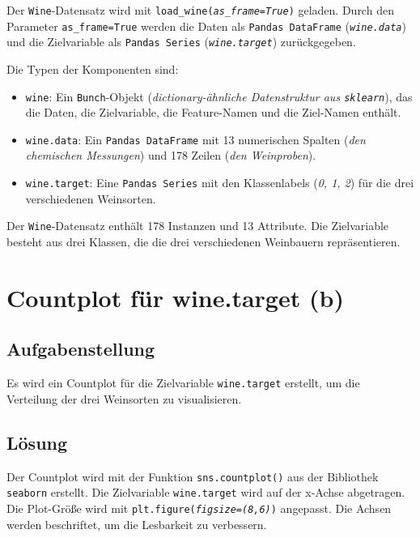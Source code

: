 Der \texttt{Wine}-Datensatz wird mit \texttt{load\_wine(\textit{as\_frame=True})} geladen. Durch den Parameter \texttt{as\_frame=True} werden die Daten als \texttt{Pandas DataFrame} (\textit{\texttt{wine.data}}) und die Zielvariable als \texttt{Pandas Series} (\textit{\texttt{wine.target}}) zurückgegeben.

Die Typen der Komponenten sind:

\begin{itemize}
    \item \texttt{wine}: Ein \texttt{Bunch}-Objekt (\textit{dictionary-ähnliche Datenstruktur aus \texttt{sklearn}}), das die Daten, die Zielvariable, die Feature-Namen und die Ziel-Namen enthält.
    \item \texttt{wine.data}: Ein \texttt{Pandas DataFrame} mit 13 numerischen Spalten (\textit{den chemischen Messungen}) und 178 Zeilen (\textit{den Weinproben}).
    \item \texttt{wine.target}: Eine \texttt{Pandas Series} mit den Klassenlabels (\textit{0, 1, 2}) für die drei verschiedenen Weinsorten.
\end{itemize}

Der \texttt{Wine}-Datensatz enthält 178 Instanzen und 13 Attribute. Die Zielvariable besteht aus drei Klassen, die die drei verschiedenen Weinbauern repräsentieren.

\cleardoublepage


\section{Countplot für wine.target (b)}
\label{sec:3b}

\subsection{Aufgabenstellung}

Es wird ein Countplot für die Zielvariable \texttt{wine.target} erstellt, um die Verteilung der drei Weinsorten zu visualisieren.

\subsection{Lösung}

Der Countplot wird mit der Funktion \texttt{sns.countplot()} aus der Bibliothek \texttt{seaborn} erstellt. Die Zielvariable \texttt{wine.target} wird auf der x-Achse abgetragen. Die Plot-Größe wird mit \texttt{plt.figure(\textit{figsize=(8,6)})} angepasst. Die Achsen werden beschriftet, um die Lesbarkeit zu verbessern.

